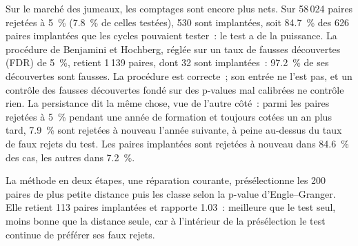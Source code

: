 \begin{omfigure}

\label{fig:s1:pairs-and-baskets:calib}
\end{omfigure}

Sur le marché des jumeaux, les comptages sont encore plus nets. Sur 58\,024 paires rejetées à 5~\% (7.8~\% de celles testées), 530 sont implantées, soit 84.7~\% des 626 paires implantées
que les cycles pouvaient tester~: le test a de la puissance. La procédure de Benjamini et Hochberg, réglée sur un taux de fausses découvertes (FDR) de 5~\%, retient 1\,139 paires, dont 32 sont
implantées~: 97.2~\% de ses découvertes sont fausses. La procédure est correcte~; son entrée ne l'est pas, et un contrôle des fausses découvertes fondé sur des p-values mal calibrées
ne contrôle rien. La persistance dit la même chose, vue de l'autre côté~: parmi les paires rejetées à 5~\% pendant une année de formation et toujours cotées un an plus tard,
7.9~\% sont rejetées à nouveau l'année suivante, à peine au-dessus du taux de faux rejets du test. Les paires implantées sont rejetées à nouveau dans 84.6~\% des cas,
les autres dans 7.2~\%.

La méthode en deux étapes, une réparation courante, présélectionne les 200 paires de plus petite distance puis les classe selon la p-value d'Engle--Granger. Elle retient 113 paires implantées
et rapporte 1.03~: meilleure que le test seul, moins bonne que la distance seule, car à l'intérieur de la présélection le test continue de préférer ses faux rejets.

